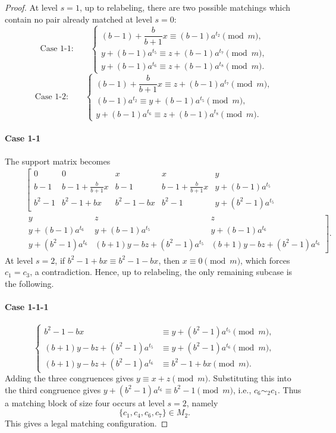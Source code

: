 \documentclass[11pt]{article}
\newcommand{\mymod}{\pmod{m}}
\begin{document}
\begin{proof}
At level $s=1$, up to relabeling, there are two possible matchings which contain no pair already matched at level $s=0$:
\[
\text{Case 1-1:}\qquad
\begin{cases}
(b-1)+\dfrac{b}{b+1}x \equiv (b-1)a^{t_2}\mymod,\\
y+(b-1)a^{t_5} \equiv z+(b-1)a^{t_7}\mymod,\\
y+(b-1)a^{t_6} \equiv z+(b-1)a^{t_8}\mymod.
\end{cases}
\]
\[
\text{Case 1-2:}\qquad
\begin{cases}
(b-1)+\dfrac{b}{b+1}x \equiv z+(b-1)a^{t_7}\mymod,\\
(b-1)a^{t_2} \equiv y+(b-1)a^{t_5}\mymod,\\
y+(b-1)a^{t_6} \equiv z+(b-1)a^{t_8}\mymod.
\end{cases}
\]
\paragraph{Case 1-1}
The support matrix becomes
\begin{eqnarray*}
		~&~&\left[\begin{array}{ccccc}
			0 & 0 & x & x & y\\
			  b-1 & b-1+\frac{b}{b+1}x & b-1 & b-1+\frac{b}{b+1}x & y+(b-1)a^{t_5}\\
            b^2 -1 & b^2-1+bx & b^2-1-bx &b^2-1 & y+(b^2-1)a^{t_5}
            \end{array} \right. \\
		~&~& \left. \begin{array}{ccc} 
            y & z & z\\
		      y+(b-1)a^{t_6} & y+(b-1)a^{t_5} & y+(b-1)a^{t_6} \\
			y+(b^2-1)a^{t_6} & (b+1)y-bz+(b^2-1)a^{t_5} & (b+1)y-bz+(b^2-1)a^{t_6}
        \end{array}
        \right]
        .
\end{eqnarray*}
At level $s=2$, if
$b^2-1+bx\equiv b^2-1-bx$,
then $x\equiv0\mymod$, which forces $c_1=c_3$, a contradiction. 
Hence, up to relabeling, the only remaining subcase is the following.

\paragraph{Case 1-1-1}
$$
\begin{cases}
	b^2-1-bx &\equiv y+(b^2-1)a^{t_5}\mymod,\\
	(b+1)y-bz+(b^2-1)a^{t_5} &\equiv y+(b^2-1)a^{t_6}\mymod,\\
	(b+1)y-bz+(b^2-1)a^{t_6} &\equiv b^2-1+bx\mymod.
\end{cases}
$$
Adding the three congruences gives $y\equiv x+z \mymod$.
Substituting this into the third congruence gives
$y+(b^2-1)a^{t_6}\equiv b^2-1\mymod$, i.e., $c_6\sim_2 c_1$.
Thus a matching block of size four occurs at level $s=2$, namely
$$
\{c_1,c_4,c_6,c_7\}\in M_2.
$$
This gives a legal matching configuration.


\end{proof}
\end{document}
